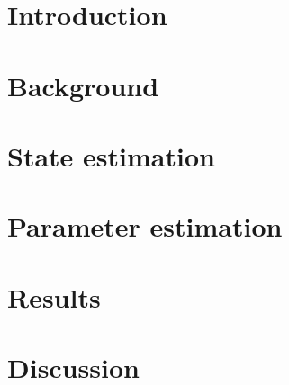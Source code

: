 \documentclass[english,12pt]{article}
\begin{document}

\makecoverpage



%


\tableofcontents

%


\cleardoublepage
\storeinipagenumber
{}
\setcounter{page}{1}


\section{Introduction}



\thispagestyle{empty}


\clearpage

\section{Background}



\section{State estimation}


\section{Parameter estimation}



\section{Results}


\section{Discussion}


	
\clearpage
\listoftodos
\printbibliography
\clearpage
\appendix
\end{document}
